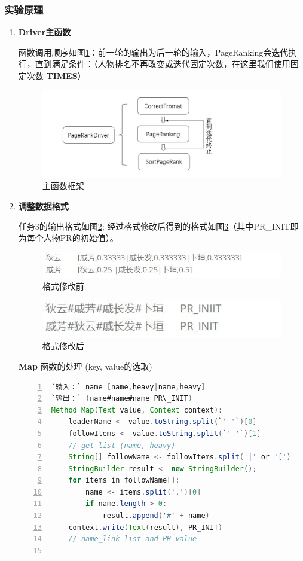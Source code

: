 \documentclass{ctexart}
\begin{document}
	\subsubsection{实验原理}
	\begin{enumerate}[I]
		\item \textbf{Driver主函数}
		\par 函数调用顺序如图\ref{fig:drivercall}：前一轮的输出为后一轮的输入，PageRanking会迭代执行，直到满足条件：（人物排名不再改变或迭代固定次数，在这里我们使用固定次数 \textbf{TIMES}）
		\begin{figure}[H]
			\centering
			\includegraphics[width=0.7\linewidth]{pic/task4/driverCall}
			\caption{主函数框架}
			\label{fig:drivercall}
		\end{figure}
	
		\item  \textbf{调整数据格式} 
		\par 任务3的输出格式如图\ref{fig:task4cf};
			经过格式修改后得到的格式如图\ref{fig:task3output}（其中PR\_INIT即为每个人物PR的初始值）。
		\begin{figure}[H]
			\centering
			\includegraphics[width=0.7\linewidth]{pic/task4/task3output}
			\caption{格式修改前}
			\label{fig:task4cf}
		\end{figure}
		\begin{figure}[H]
			\centering
			\includegraphics[width=0.7\linewidth]{pic/task4/task4CF}
			\caption{格式修改后}
			\label{fig:task3output}
		\end{figure}
		\par \textbf{Map} 函数的处理 (key, value的选取)
		\begin{lstlisting}[language=java, numbers=left, numberstyle=\tiny, frame=shadowbox, basicstyle=\ttfamily, escapeinside=``] 
`输入：` name [name,heavy|name,heavy]
`输出：` (name#name#name PR\_INIT)
Method Map(Text value, Context context):
	leaderName <- value.toString.split(`' '`)[0]
	followItems <- value.toString.split(`' '`)[1] 
	// get list (name, heavy)
	String[] followName <- followItems.split('|' or '[') 
	StringBuilder result <- new StringBuilder();
	for items in followName[]:
		name <- items.split(',')[0]
		if name.length > 0:
			result.append('#' + name)
	context.write(Text(result), PR_INIT)	
	// name_link list and PR value
		

\end{lstlisting}
\end{enumerate}
\end{document}
